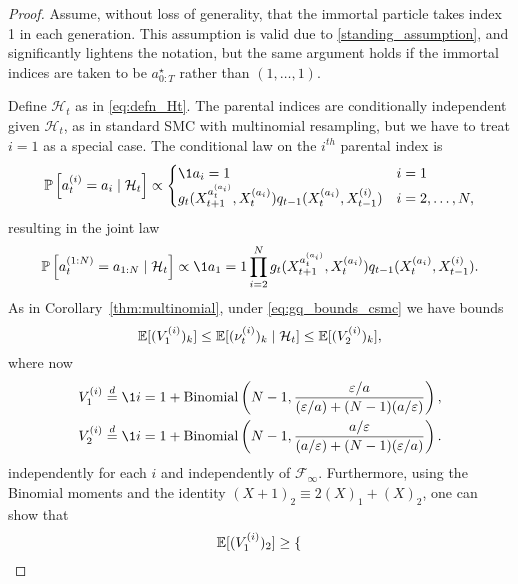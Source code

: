 \begin{proof}
Assume, without loss of generality, that the immortal particle takes index 1 in each generation. This assumption is valid due to \ref{standing_assumption}, and significantly lightens the notation, but the same argument holds if the immortal indices are taken to be $a_{0:T}^\star$ rather than $(1,\dots,1)$.

Define $\mathcal{H}_t$ as in \eqref{eq:defn_Ht}.
The parental indices are conditionally independent given $\mathcal{H}_t$, as in standard SMC with multinomial resampling, but we have to treat $i=1$ as a special case. The conditional law on the $i^{th}$ parental index is
\begin{equation*}
\Prob \left[ a_t^{(i)} = a_i \mid \mathcal{H}_t \right] \propto
\begin{cases}
\1{a_i=1} &i=1 \\
g_t( X_{t+1}^{a_t^{(a_i)}} , X_t^{(a_i)} ) q_{t-1}(X_t^{(a_i)}, X_{t-1}^{(i)}) &i=2,\dots,N ,
\end{cases}
\end{equation*}
resulting in the joint law
\begin{equation*}
\Prob \left[ a_t^{(1:N)} = a_{1:N} \mid \mathcal{H}_t \right] 
\propto \1{a_1 = 1} \prod_{i=2}^N g_t( X_{t+1}^{a_t^{(a_i)}} , X_t^{(a_i)} )  
        q_{t-1}(X_t^{(a_i)}, X_{t-1}^{(i)}).
\end{equation*}
As in Corollary~\ref{thm:multinomial}, under \eqref{eq:gq_bounds_csmc} we have bounds
\begin{equation*}
\mathbb{E}[ (V_1^{(i)})_k ]
\leq \mathbb{E}[ (\nu_t^{(i)})_k \mid \mathcal{H}_t ]
\leq \mathbb{E}[ (V_2^{(i)})_k ] ,
\end{equation*}
where now
\begin{align*}
& V_1^{(i)} 
    \eqdist \1{i=1} + \operatorname{Binomial}\left(N-1, 
        \frac{\varepsilon/a}{(\varepsilon/a) + (N-1)(a/\varepsilon)} \right) , \\
& V_2^{(i)} 
    \eqdist \1{i=1} + \operatorname{Binomial}\left( N-1, 
        \frac{a/\varepsilon}{(a/\varepsilon) + (N-1)(\varepsilon/a)} \right) .
\end{align*}
independently for each $i$ and independently of $\mathcal{F}_\infty$.
Furthermore, using the Binomial moments and the identity $(X+1)_2 \equiv 2(X)_1 +(X)_2$, one can show that
\begin{equation*}
\mathbb{E}[ (V_1^{(i)} )_2 ]
\geq \begin{cases}

\end{cases}
\end{equation*}
\end{proof}
